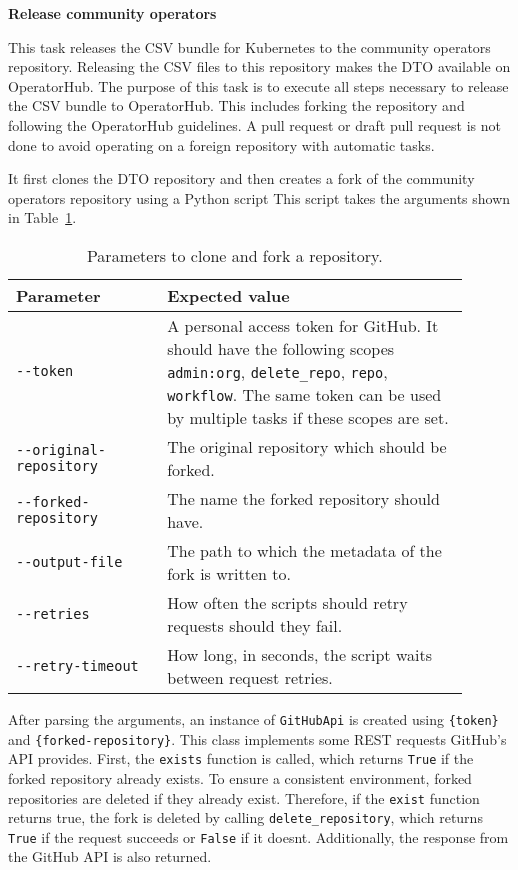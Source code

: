 \textbf{Release community operators}

This task releases the CSV bundle for Kubernetes to the community operators repository.
Releasing the CSV files to this repository makes the DTO available on OperatorHub.
The purpose of this task is to execute all steps necessary to release the CSV bundle to OperatorHub.
This includes forking the repository and following the OperatorHub guidelines.
A pull request or draft pull request is not done to avoid operating on a foreign repository with automatic tasks.

It first clones the DTO repository and then creates a fork of the community operators repository using a Python script
This script takes the arguments shown in Table~\ref{tab:parameters-to-clone-and-fork-a-repository}.

\begin{table}[h]
    \centering
    \caption{Parameters to clone and fork a repository.}
    \label{tab:parameters-to-clone-and-fork-a-repository}
    \begin{tabular}{p{0.3\linewidth}|p{0.6\linewidth}}
        Parameter & Expected value \\
        \hline
        \verb|--token| & A personal access token for GitHub.
            It should have the following scopes \verb|admin:org|, \verb|delete_repo|, \verb|repo|, \verb|workflow|.
            The same token can be used by multiple tasks if these scopes are set. \\
        \verb|--original-repository| & The original repository which should be forked. \\
        \verb|--forked-repository| & The name the forked repository should have. \\
        \verb|--output-file| & The path to which the metadata of the fork is written to. \\
        \verb|--retries| & How often the scripts should retry requests should they fail. \\
        \verb|--retry-timeout| & How long, in seconds, the script waits between request retries. \\
    \end{tabular}
\end{table}

\pagebreak

After parsing the arguments, an instance of \verb|GitHubApi| is created using \verb|{token}| and \verb|{forked-repository}|.
This class implements some REST requests GitHub's API provides.
First, the \verb|exists| function is called, which returns \verb|True| if the forked repository already exists.
To ensure a consistent environment, forked repositories are deleted if they already exist.
Therefore, if the \verb|exist| function returns true, the fork is deleted by calling \verb|delete_repository|, which returns \verb|True| if the request succeeds or \verb|False| if it doesnt.
Additionally, the response from the GitHub API is also returned.

